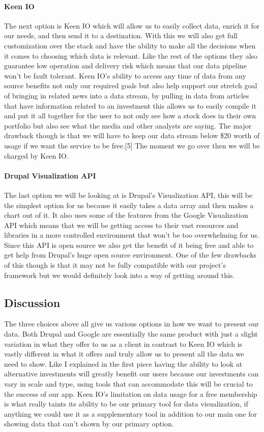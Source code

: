 \documentclass[onecolumn, draftclsnofoot,10pt, compsoc]{IEEEtran}
\begin{document}
\paragraph{Keen IO}
The next option is Keen IO which will allow us to easily collect data, enrich it for our needs, and then send it to a destination. With this we will also get full customization over the stack and have the ability to make all the decisions when it comes to choosing which data is relevant. Like the rest of the options they also guarantee low operation and delivery risk which means that our data pipeline won’t be fault tolerant. Keen IO’s ability to access any time of data from any source benefits not only our required goals but also help support our stretch goal of bringing in related news into a data stream, by pulling in data from articles that have information related to an investment this allows us to easily compile it and put it all together for the user to not only see how a stock does in their own portfolio but also see what the media and other analysts are saying. The major drawback though is that we will have to keep our data stream below \$20 worth of usage if we want the service to be free.[5] The moment we go over then we will be charged by Keen IO. 

\paragraph{Drupal Visualization API}
The last option we will be looking at is Drupal’s Visualization API, this will be the simplest option for us because it easily takes a data array and then makes a chart out of it. It also uses some of the features from the Google Visualization API which means that we will be getting access to their vast resources and libraries in a more controlled environment that won’t be too overwhelming for us. Since this API is open source we also get the benefit of it being free and able to get help from Drupal’s huge open source environment. One of the few drawbacks of this though is that it may not be fully compatible with our project’s framework but we would definitely look into a way of getting around this.

\subsection{Discussion}
The three choices above all give us various options in how we want to present our data. Both Drupal and Google are essentially the same product with just a slight variation in what they offer to us as a client in contrast to Keen IO which is vastly different in what it offers and truly allow us to present all the data we need to show. Like I explained in the first piece having the ability to look at alternative investments will greatly benefit our users because our investments can vary in scale and type, using tools that can accommodate this will be crucial to the success of our app. Keen IO’s limitation on data usage for a free membership is what really taints its ability to be our primary tool for data visualization, if anything we could use it as a supplementary tool in addition to our main one for showing data that can’t shown by our primary option. 
\end{document}
